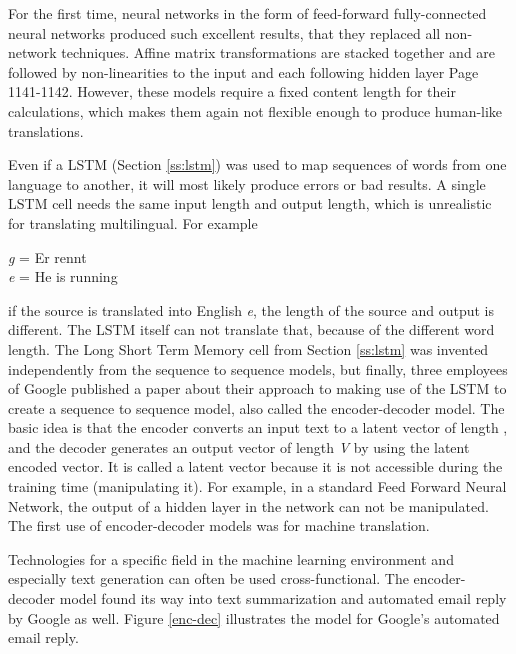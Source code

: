 For the first time, neural networks in the form of feed-forward fully-connected neural networks produced such excellent results, that they replaced all non-network techniques. Affine matrix transformations are stacked together and are followed by non-linearities to the input and each following hidden layer \cite{Bengio} Page 1141-1142. However, these models require a fixed content length for their calculations, which makes them again not flexible enough to produce human-like translations.  

Even if a LSTM (Section \ref{ss:lstm}) was used to map sequences of words from one language to another, it will most likely produce errors or bad results. A single LSTM cell needs the same input length and output length, which is unrealistic for translating multilingual. For example

\begin{tcolorbox}
	\textit{g} = Er rennt \\
	\textit{e} = He is running 
\end{tcolorbox}

if the source  is translated into English \textit{e}, the length of the source and output is different.
The LSTM itself can not translate that, because of the different word length. 
The Long Short Term Memory cell from Section \ref{ss:lstm} was invented independently from the sequence to sequence models, but
finally, three employees of Google published a paper about their approach to making use of the LSTM to create a sequence to sequence model, also called the encoder-decoder model.
The basic idea is that the encoder converts an input text to a latent vector of length , and the decoder generates an output vector of length \textit{V} by using the latent encoded vector. It is called a latent vector because it is not accessible during the training time (manipulating it). For example, in a standard Feed Forward Neural Network, the output of a hidden layer in the network can not be manipulated. The first use of encoder-decoder models was for machine translation.

Technologies for a specific field in the machine learning environment and especially text generation can often be used cross-functional. The encoder-decoder model found its way into text summarization and automated email reply by Google \cite{google} as well. Figure \ref{enc-dec} illustrates the model for Google's automated email reply.

